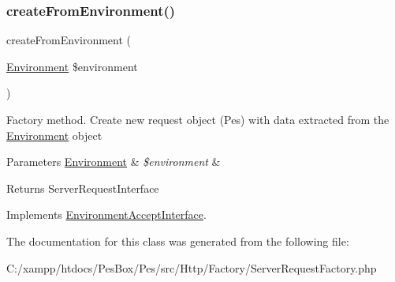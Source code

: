 \subsubsection{\texorpdfstring{create\+From\+Environment()}{createFromEnvironment()}}
{\footnotesize\ttfamily create\+From\+Environment (\begin{DoxyParamCaption}\item[{\mbox{\hyperlink{class_pes_1_1_http_1_1_environment}{Environment}}}]{\$environment }\end{DoxyParamCaption})}

Factory method. Create new request object (Pes) with data extracted from the \mbox{\hyperlink{class_pes_1_1_http_1_1_environment}{Environment}} object


\begin{DoxyParams}[1]{Parameters}
\mbox{\hyperlink{class_pes_1_1_http_1_1_environment}{Environment}} & {\em \$environment} & \\
\hline
\end{DoxyParams}
\begin{DoxyReturn}{Returns}
Server\+Request\+Interface 
\end{DoxyReturn}


Implements \mbox{\hyperlink{interface_pes_1_1_http_1_1_factory_1_1_environment_accept_interface}{Environment\+Accept\+Interface}}.



The documentation for this class was generated from the following file\+:\begin{DoxyCompactItemize}
\item 
C\+:/xampp/htdocs/\+Pes\+Box/\+Pes/src/\+Http/\+Factory/Server\+Request\+Factory.\+php\end{DoxyCompactItemize}
